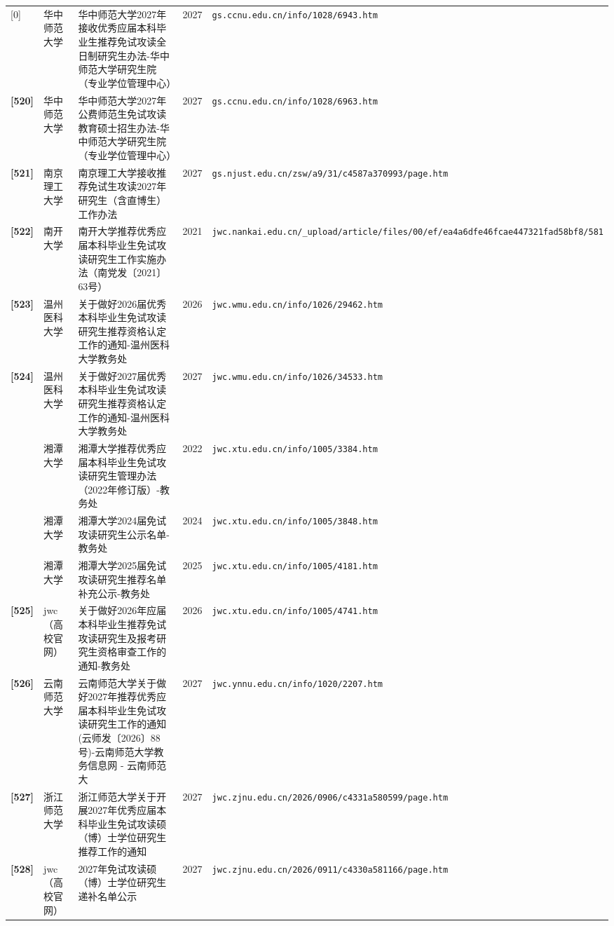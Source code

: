 {\begin{longtable}{@{}p{1.15cm}p{2.9cm}p{6.3cm}p{0.85cm}p{5.0cm}@{}}
[0] & 华中师范大学 & 华中师范大学2027年接收优秀应届本科毕业生推荐免试攻读全日制研究生办法-华中师范大学研究生院（专业学位管理中心） & 2027 & \texttt{gs.ccnu.edu.cn/info/1028/6943.htm} \\
\textbf{[520]} & 华中师范大学 & 华中师范大学2027年公费师范生免试攻读教育硕士招生办法-华中师范大学研究生院（专业学位管理中心） & 2027 & \texttt{gs.ccnu.edu.cn/info/1028/6963.htm} \\
\textbf{[521]} & 南京理工大学 & 南京理工大学接收推荐免试生攻读2027年研究生（含直博生）工作办法 & 2027 & \texttt{gs.njust.edu.cn/zsw/a9/31/c4587a370993/page.htm} \\
\textbf{[522]} & 南开大学 & 南开大学推荐优秀应届本科毕业生免试攻读研究生工作实施办法（南党发〔2021〕63号） & 2021 & \texttt{jwc.nankai.edu.cn/\_upload/article/files/00/ef/ea4a6dfe46fcae447321fad58bf8/581} \\
\textbf{[523]} & 温州医科大学 & 关于做好2026届优秀本科毕业生免试攻读研究生推荐资格认定工作的通知-温州医科大学教务处 & 2026 & \texttt{jwc.wmu.edu.cn/info/1026/29462.htm} \\
\textbf{[524]} & 温州医科大学 & 关于做好2027届优秀本科毕业生免试攻读研究生推荐资格认定工作的通知-温州医科大学教务处 & 2027 & \texttt{jwc.wmu.edu.cn/info/1026/34533.htm} \\
[0] & 湘潭大学 & 湘潭大学推荐优秀应届本科毕业生免试攻读研究生管理办法（2022年修订版）-教务处 & 2022 & \texttt{jwc.xtu.edu.cn/info/1005/3384.htm} \\
[0] & 湘潭大学 & 湘潭大学2024届免试攻读研究生公示名单-教务处 & 2024 & \texttt{jwc.xtu.edu.cn/info/1005/3848.htm} \\
[0] & 湘潭大学 & 湘潭大学2025届免试攻读研究生推荐名单补充公示-教务处 & 2025 & \texttt{jwc.xtu.edu.cn/info/1005/4181.htm} \\
\textbf{[525]} & jwc（高校官网） & 关于做好2026年应届本科毕业生推荐免试攻读研究生及报考研究生资格审查工作的通知-教务处 & 2026 & \texttt{jwc.xtu.edu.cn/info/1005/4741.htm} \\
\textbf{[526]} & 云南师范大学 & 云南师范大学关于做好2027年推荐优秀应届本科毕业生免试攻读研究生工作的通知(云师发〔2026〕88号)-云南师范大学教务信息网 - 云南师范大 & 2027 & \texttt{jwc.ynnu.edu.cn/info/1020/2207.htm} \\
\textbf{[527]} & 浙江师范大学 & 浙江师范大学关于开展2027年优秀应届本科毕业生免试攻读硕（博）士学位研究生推荐工作的通知 & 2027 & \texttt{jwc.zjnu.edu.cn/2026/0906/c4331a580599/page.htm} \\
\textbf{[528]} & jwc（高校官网） & 2027年免试攻读硕（博）士学位研究生递补名单公示 & 2027 & \texttt{jwc.zjnu.edu.cn/2026/0911/c4330a581166/page.htm} \\

\end{longtable}}
